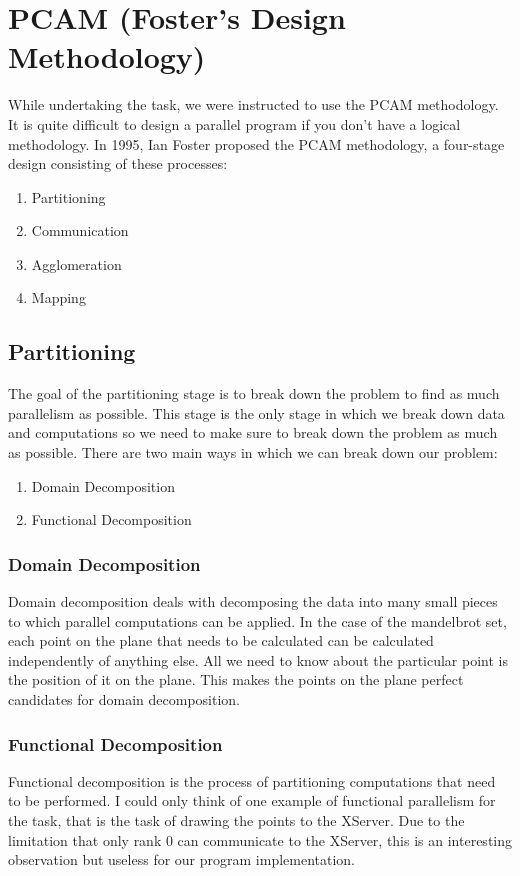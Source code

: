 \documentclass{article}
\begin{document}
\section{PCAM (Foster's Design Methodology)}
    While undertaking the task, we were instructed to use the PCAM methodology. It is quite difficult to design a parallel program
    if you don't have a logical methodology. In 1995, Ian Foster proposed the PCAM methodology, a four-stage design consisting of
    these processes:

    \begin{enumerate}  
    \item Partitioning
    \item Communication 
    \item Agglomeration 
    \item Mapping 
    \end{enumerate}
    
    \subsection{Partitioning}
        The goal of the partitioning stage is to break down the problem to find as much parallelism as possible. This stage is the only stage
        in which we break down data and computations so we need to make sure to break down the problem as much as possible. There are two main 
        ways in which we can break down our problem: 
        
        \begin{enumerate}  
        \item Domain Decomposition
        \item Functional Decomposition 
        \end{enumerate}
 
        \subsubsection{Domain Decomposition}
            Domain decomposition deals with decomposing the data into many small pieces to which parallel computations can be applied.
            In the case of the mandelbrot set, each point on the plane that needs to be calculated can be calculated independently of 
            anything else. All we need to know about the particular point is the position of it on the plane. This makes the points on the 
            plane perfect candidates for domain decomposition.

        \subsubsection{Functional Decomposition}
            Functional decomposition is the process of partitioning computations that need to be performed. I could only think of one example
            of functional parallelism for the task, that is the task of drawing the points to the XServer. Due to the limitation that only
            rank 0 can communicate to the XServer, this is an interesting observation but useless for our program implementation.
    
\end{document}
